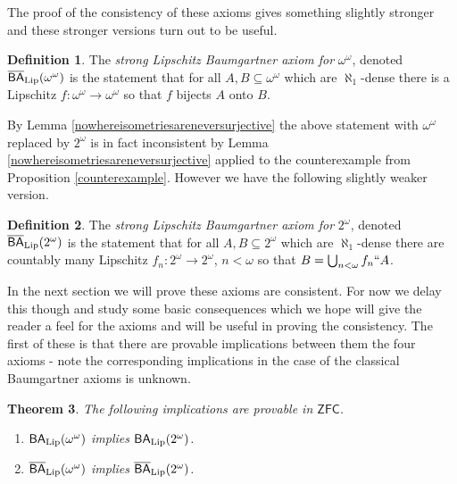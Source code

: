 \documentclass[leqno,11pt]{amsart}
\newtheorem{theorem}{Theorem}[section]
\theoremstyle{definition}
\newtheorem{definition}[theorem]{Definition}
\theoremstyle{remark}
\def\ZFC{\mathsf{ZFC}}
\def\BA{\mathsf{BA}}
\def\baire{\omega^\omega}
\def\cantor{2^\omega}
\begin{document}
The proof of the consistency of these axioms gives something slightly stronger and these stronger versions turn out to be useful.
\begin{definition} \label{BAlipDef2}
    The {\em strong Lipschitz Baumgartner axiom for} $\baire$, denoted $\overline{\BA}_{\rm Lip}(\baire)$ is the statement that for all $A, B \subseteq \baire$ which are $\aleph_1$-dense there is a Lipschitz $f:\baire \to \baire$ so that $f$ bijects $A$ onto $B$. 
\end{definition}
By Lemma \ref{nowhereisometriesareneversurjective} the above statement with $\baire$ replaced by $2^\omega$ is in fact inconsistent by Lemma \ref{nowhereisometriesareneversurjective} applied to the counterexample from Proposition \ref{counterexample}. However we have the following slightly weaker version.
\begin{definition}
    The {\em strong Lipschitz Baumgartner axiom for} $\cantor$, denoted $\overline{\BA}_{\rm Lip}(\cantor)$ is the statement that for all $A, B \subseteq \cantor$ which are $\aleph_1$-dense there are countably many Lipschitz $f_n:\cantor \to \cantor$, $n < \omega$ so that $B = \bigcup_{n < \omega} f_n``A$. 
\end{definition}
In the next section we will prove these axioms are consistent. For now we delay this though and study some basic consequences which we hope will give the reader a feel for the axioms and will be useful in proving the consistency. The first of these is that there are provable implications between them the four axioms - note the corresponding implications in the case of the classical Baumgartner axioms is unknown.

\begin{theorem} \label{implications}
 The following implications are provable in $\ZFC$.
 \begin{enumerate}
     \item $\BA_{\rm Lip}(\baire)$ implies $\BA_{\rm Lip}(\cantor)$.
     \item $\overline{\BA}_{\rm Lip}(\baire)$ implies $\overline{\BA}_{\rm Lip}(\cantor)$.
 \end{enumerate}
\end{theorem}
\end{document}
